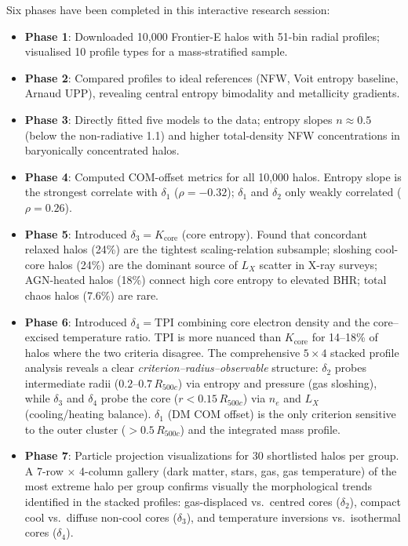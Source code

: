 \documentclass[12pt,a4paper]{article}
\begin{document}
Six phases have been completed in this interactive research session:
\begin{itemize}
  \item \textbf{Phase 1}: Downloaded 10,000 Frontier-E halos with 51-bin radial profiles;
        visualised 10 profile types for a mass-stratified sample.
  \item \textbf{Phase 2}: Compared profiles to ideal references (NFW, Voit entropy baseline,
        Arnaud UPP), revealing central entropy bimodality and metallicity gradients.
  \item \textbf{Phase 3}: Directly fitted five models to the data; entropy slopes
        $n \approx 0.5$ (below the non-radiative 1.1) and higher total-density
        NFW concentrations in baryonically concentrated halos.
  \item \textbf{Phase 4}: Computed COM-offset metrics for all 10,000 halos. Entropy slope
        is the strongest correlate with $\delta_1$ ($\rho=-0.32$); $\delta_1$ and $\delta_2$
        only weakly correlated ($\rho=0.26$).
  \item \textbf{Phase 5}: Introduced $\delta_3 = K_\mathrm{core}$ (core entropy).
        Found that concordant relaxed halos (24\%) are the tightest scaling-relation
        subsample; sloshing cool-core halos (24\%) are the dominant source of
        $L_X$ scatter in X-ray surveys; AGN-heated halos (18\%) connect high core
        entropy to elevated BHR; total chaos halos (7.6\%) are rare.
  \item \textbf{Phase 6}: Introduced $\delta_4 = \mathrm{TPI}$ combining core
        electron density and the core--excised temperature ratio.
        TPI is more nuanced than $K_\mathrm{core}$ for 14--18\% of halos where
        the two criteria disagree.
        The comprehensive $5\times4$ stacked profile analysis reveals a clear
        \emph{criterion--radius--observable} structure:
        $\delta_2$ probes intermediate radii ($0.2$--$0.7\,R_{500c}$) via entropy and
        pressure (gas sloshing), while $\delta_3$ and $\delta_4$ probe the core
        ($r < 0.15\,R_{500c}$) via $n_e$ and $L_X$ (cooling/heating balance).
        $\delta_1$ (DM COM offset) is the only criterion sensitive to the outer
        cluster ($> 0.5\,R_{500c}$) and the integrated mass profile.
  \item \textbf{Phase 7}: Particle projection visualizations for 30 shortlisted halos
        per group.  A 7-row $\times$ 4-column gallery (dark matter, stars, gas, gas
        temperature) of the most extreme halo per group confirms visually the
        morphological trends identified in the stacked profiles: gas-displaced vs.\
        centred cores ($\delta_2$), compact cool vs.\ diffuse non-cool cores ($\delta_3$),
        and temperature inversions vs.\ isothermal cores ($\delta_4$).
\end{itemize}
\end{document}
